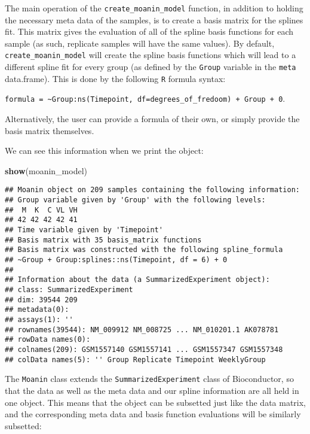 \documentclass[9pt,a4paper,]{extarticle}
\newenvironment{Shaded}{\begin{snugshade}}{\end{snugshade}}
\newcommand{\KeywordTok}[1]{\textcolor[rgb]{0.13,0.29,0.53}{\textbf{#1}}}
\newcommand{\NormalTok}[1]{#1}
\begin{document}
The main operation of the \texttt{create\_moanin\_model} function, in addition to holding the necessary meta data of the samples,
is to create a basis matrix for the splines fit. This matrix gives the evaluation of all of the spline basis functions for
each sample (as such, replicate samples will have the same
values). By default, \texttt{create\_moanin\_model} will create the spline basis functions which will lead to a different spline fit for every group (as defined by the \texttt{Group} variable
in the \texttt{meta} data.frame). This is done by the following \texttt{R} formula syntax:

\texttt{formula\ =\ \textasciitilde{}Group:ns(Timepoint,\ df=degrees\_of\_fredoom)\ +\ Group\ +\ 0}.

Alternatively, the user can provide a formula of their own, or simply provide the basis matrix themselves.

We can see this information when we print the object:

\begin{Shaded}
\begin{Highlighting}[]
\KeywordTok{show}\NormalTok{(moanin_model)}
\end{Highlighting}
\end{Shaded}

\begin{verbatim}
## Moanin object on 209 samples containing the following information:
## Group variable given by 'Group' with the following levels:
##  M  K  C VL VH 
## 42 42 42 42 41 
## Time variable given by 'Timepoint'
## Basis matrix with 35 basis_matrix functions
## Basis matrix was constructed with the following spline_formula
## ~Group + Group:splines::ns(Timepoint, df = 6) + 0 
## 
## Information about the data (a SummarizedExperiment object):
## class: SummarizedExperiment 
## dim: 39544 209 
## metadata(0):
## assays(1): ''
## rownames(39544): NM_009912 NM_008725 ... NM_010201.1 AK078781
## rowData names(0):
## colnames(209): GSM1557140 GSM1557141 ... GSM1557347 GSM1557348
## colData names(5): '' Group Replicate Timepoint WeeklyGroup
\end{verbatim}

The \texttt{Moanin} class extends the \texttt{SummarizedExperiment} class of Bioconductor, so that the data as well as the meta data and our spline information are all held in one object. This means that the object can be subsetted just like the data matrix, and the corresponding meta data and basis function evaluations will be similarly subsetted:
\end{document}
